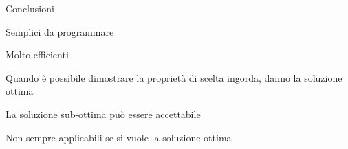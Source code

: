 \begin{frame}{Conclusioni}
\BIL
\item  Semplici da programmare
\item Molto efficienti
\item Quando è possibile dimostrare la proprietà di scelta ingorda, danno la soluzione ottima
\item La soluzione sub-ottima può essere accettabile
\EIL

\bigskip
{}
\BIL
\item Non sempre applicabili se si vuole la soluzione ottima
\EIL

\end{frame}






